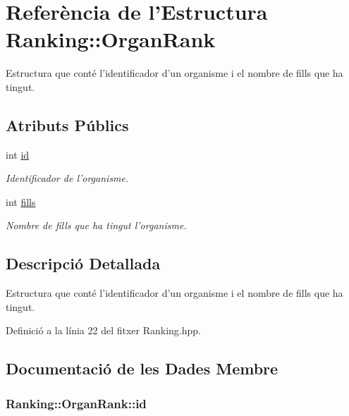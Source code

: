 \hypertarget{struct_ranking_1_1_organ_rank}{\section{Referència de l'Estructura Ranking\-:\-:Organ\-Rank}
\label{struct_ranking_1_1_organ_rank}
}


Estructura que conté l'identificador d'un organisme i el nombre de fills que ha tingut.  


\subsection*{Atributs Públics}
\begin{DoxyCompactItemize}
\item 
int \hyperlink{struct_ranking_1_1_organ_rank_ac2d4f698161d7410be2d7a9e2e96bd5f}{id}
\begin{DoxyCompactList}\small\item\em Identificador de l'organisme. \end{DoxyCompactList}\item 
int \hyperlink{struct_ranking_1_1_organ_rank_a127f9a8768fd7cfda05c3cb2f9f8cfee}{fills}
\begin{DoxyCompactList}\small\item\em Nombre de fills que ha tingut l'organisme. \end{DoxyCompactList}\end{DoxyCompactItemize}


\subsection{Descripció Detallada}
Estructura que conté l'identificador d'un organisme i el nombre de fills que ha tingut. 

Definició a la línia 22 del fitxer Ranking.\-hpp.



\subsection{Documentació de les Dades Membre}
\hypertarget{struct_ranking_1_1_organ_rank_ac2d4f698161d7410be2d7a9e2e96bd5f}{
\subsubsection[{id}]{\setlength{\rightskip}{0pt plus 5cm}Ranking\-::\-Organ\-Rank\-::id}}\label{struct_ranking_1_1_organ_rank_ac2d4f698161d7410be2d7a9e2e96bd5f}


